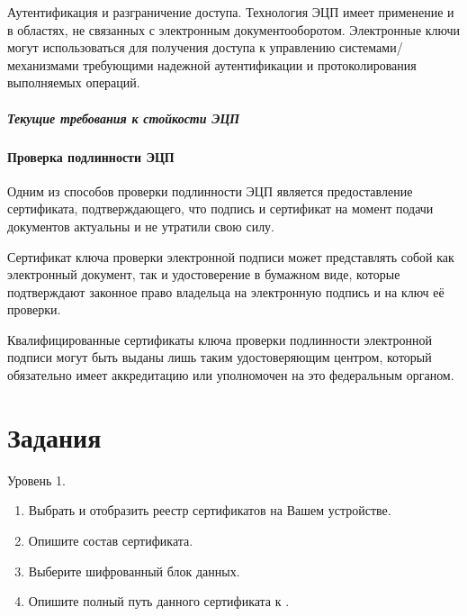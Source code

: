 \begin{Notes}
  \item Аутентификация и разграничение доступа. Технология ЭЦП имеет применение и в областях, не связанных с электронным документооборотом. Электронные ключи могут использоваться для получения доступа к управлению системами/механизмами требующими надежной аутентификации и протоколирования выполняемых операций.
\end{Notes}

\subparagraph{Текущие требования к стойкости ЭЦП}


\paragraph{Проверка подлинности ЭЦП}

Одним из способов проверки подлинности ЭЦП является предоставление
сертификата, подтверждающего, что подпись и сертификат на момент подачи
документов актуальны и не утратили свою силу.

Сертификат ключа проверки электронной подписи может представлять собой как
электронный документ, так и удостоверение в бумажном виде, которые
подтверждают законное право владельца на электронную подпись и на ключ её
проверки.

Квалифицированные сертификаты ключа проверки подлинности электронной подписи
могут быть выданы лишь таким удостоверяющим центром, который обязательно
имеет аккредитацию или уполномочен на это федеральным органом.

\section{Задания}\label{sect4_b}

Уровень 1. %

\begin{enumerate}
  \item Выбрать и отобразить реестр сертификатов на Вашем устройстве.
  \item Опишите состав сертификата.
  \item Выберите шифрованный блок данных.
  \item Опишите полный путь данного сертификата к .
\end{enumerate}


